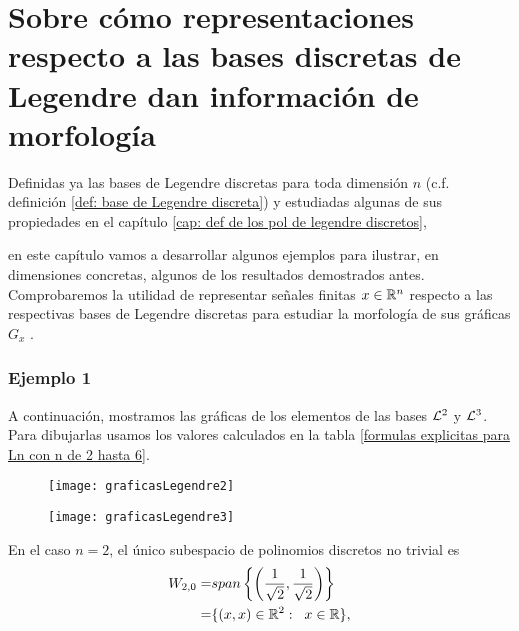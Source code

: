 \chapter{Sobre cómo representaciones respecto a las bases discretas de Legendre dan información de morfología}
\label{sec: ejemplos}

Definidas ya las bases de Legendre discretas
para toda dimensión $n$ 
(c.f. definición  
\ref{def: base de Legendre discreta}) y estudiadas algunas de sus 
propiedades en el capítulo 
\ref{cap: def de los pol de legendre discretos},{
en este capítulo vamos a desarrollar algunos ejemplos 
para ilustrar, en dimensiones concretas, algunos de los
resultados demostrados antes.
Comprobaremos la utilidad de 
representar señales finitas $ x \in \mathbb{R}^{n}$ respecto
a las respectivas bases de Legendre discretas para
estudiar la morfología de sus gráficas $G_{x}$
.


\subsection{Ejemplo 1}
\label{subs: ejm 1}

A continuación, mostramos las gráficas de los
elementos de las bases $\mathcal{L}^{2}$ y $\mathcal{L}^{3}$.
Para dibujarlas usamos los valores
calculados en la tabla
\ref{formulas explicitas para Ln con n de 2 hasta 6}.

\begin{figure}[H]
	\centering
	\texttt{[image: graficasLegendre2]} 
\end{figure}	


\begin{figure}[H]
	\centering
	\texttt{[image: graficasLegendre3]} 
\end{figure}	 




En el caso $n=2$, el único subespacio de polinomios
discretos no trivial es 
\begin{align*}
W_{2,0}= & span \left\{ 
\left(\frac{1}{\sqrt2}, \frac{1}{\sqrt2} \right) \right\} \\
= & \{ (x,x) \in \mathbb{R}^{2}: \hspace{0.2cm} x \in \mathbb{R} \},
\end{align*}

}
